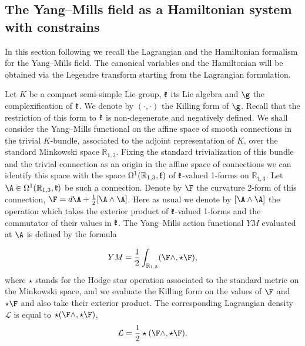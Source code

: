 \documentclass{amsart}
\begin{document}


\subsection{The Yang--Mills field as a Hamiltonian system with constrains}\label{YMh}



In this section following \cite{FS} we recall the Lagrangian and the
Hamiltonian formalism for the Yang--Mills field. The canonical variables and the Hamiltonian
will be obtained via the Legendre transform starting from the Lagrangian
formulation.

Let $K$ be a compact semi-simple Lie group, $\mathfrak k$ its Lie algebra and $\g$ the
complexification of $\mathfrak k$. We denote by $(\cdot ,\cdot )$ the Killing form of $\g$.
Recall that the restriction of this form to $\mathfrak k$ is non-degenerate and negatively defined.
We shall consider the Yang--Mills functional on the affine space of smooth
connections in the trivial $K$-bundle, associated to
the adjoint representation of $K$, over the standard Minkowski space
${\mathbb R}_{1,3}$. Fixing the standard trivialization of this bundle and the
trivial connection as an origin in the affine space of connections we can identify this space
with the space $\Omega^1(\mathbb{R}_{1,3},\mathfrak k)$ of $\mathfrak k$-valued 1-forms on ${\mathbb R}_{1,3}$.
Let $\A\in \Omega^1(\mathbb{R}_{1,3},\k)$ be such a connection.
Denote by $\F$ the curvature 2-form of this connection, $\F=d\A + \frac{1}{2} [\A\wedge \A]$.
Here as usual we denote by $[\A\wedge \A]$ the
operation which takes the
exterior product of $\mathfrak k$-valued 1-forms and the commutator of their values in
$\mathfrak k$. The Yang--Mills action functional $YM$ evaluated at $\A$ is defined by
the formula

\begin{equation}\label{YM}
YM = \frac 12 \int_{{\mathbb R}_{1,3}} (\F \wedge , \star \F),
\end{equation}
where $\star$ stands for the Hodge star operation associated to the standard
metric on the Minkowski space, and we evaluate the Killing form on the
values of $\F$ and $\star\F$ and also take their exterior product. The
corresponding Lagrangian density $\mathcal{L}$ is equal to $\star(\F \wedge ,
\star\F)$,
\begin{equation}\label{L}
\mathcal{L}=\frac 12 \star (\F \wedge , \star\F).
\end{equation}
\end{document}
